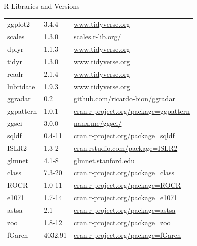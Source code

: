 \documentclass[ignorenonframetext,xcolor=dvipsnames]{beamer}
\begin{document}
\begin{frame}[label=withcode]{R Libraries and Versions}

\small
\centering

\begin{tabular}{l|l|l} \hline
ggplot2 & 3.4.4 & \url{www.tidyverse.org} \\
scales & 1.3.0 & \url{scales.r-lib.org/} \\
dplyr & 1.1.3 & \url{www.tidyverse.org} \\
tidyr & 1.3.0 & \url{www.tidyverse.org} \\
readr & 2.1.4 & \url{www.tidyverse.org} \\
lubridate & 1.9.3 & \url{www.tidyverse.org} \\
ggradar & 0.2 & \url{github.com/ricardo-bion/ggradar} \\
ggpattern & 1.0.1 & \url{cran.r-project.org/package=ggpattern} \\
ggsci & 3.0.0 & \url{nanx.me/ggsci/} \\
sqldf & 0.4-11 & \url{cran.r-project.org/package=sqldf} \\
ISLR2 & 1.3-2 & \url{cran.rstudio.com/package=ISLR2} \\
glmnet & 4.1-8 & \url{glmnet.stanford.edu} \\
class & 7.3-20 & \url{cran.r-project.org/package=class} \\
ROCR & 1.0-11 & \url{cran.r-project.org/package=ROCR} \\
e1071 & 1.7-14 & \url{cran.r-project.org/package=e1071} \\
astsa & 2.1 & \url{cran.r-project.org/package=astsa} \\
zoo & 1.8-12 & \url{cran.r-project.org/package=zoo} \\
fGarch & 4032.91 & \url{cran.r-project.org/package=fGarch} \\ \hline
\end{tabular}
\end{frame}
\end{document}
